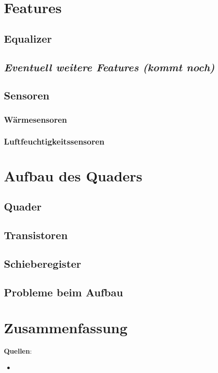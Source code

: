 \documentclass[12pt,a4paper]{article}
\begin{document}
\subsection{}


\section{Features}

\subsection{Equalizer}

\subsection{\textit{Eventuell weitere Features (kommt noch)}}

\subsection{Sensoren}

\subsubsection{Wärmesensoren}

\subsubsection{Luftfeuchtigkeitssensoren}

\section{Aufbau des Quaders}

\subsection{Quader}

\subsection{Transistoren}

\subsection{Schieberegister}

\subsection{Probleme beim Aufbau}

\section{Zusammenfassung}

\newpage

\textbf{Quellen}:

\begin{itemize}
    \item 
\end{itemize}
\end{document}

